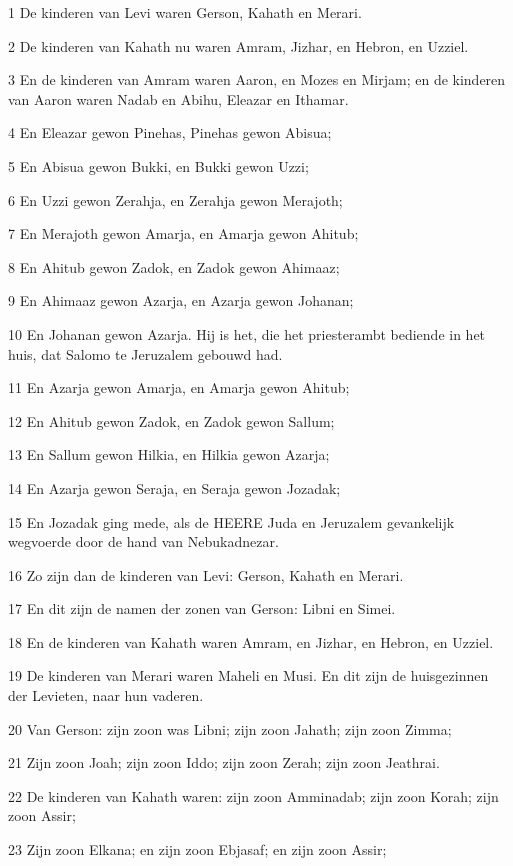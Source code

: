 \par 1 De kinderen van Levi waren Gerson, Kahath en Merari.
\par 2 De kinderen van Kahath nu waren Amram, Jizhar, en Hebron, en Uzziel.
\par 3 En de kinderen van Amram waren Aaron, en Mozes en Mirjam; en de kinderen van Aaron waren Nadab en Abihu, Eleazar en Ithamar.
\par 4 En Eleazar gewon Pinehas, Pinehas gewon Abisua;
\par 5 En Abisua gewon Bukki, en Bukki gewon Uzzi;
\par 6 En Uzzi gewon Zerahja, en Zerahja gewon Merajoth;
\par 7 En Merajoth gewon Amarja, en Amarja gewon Ahitub;
\par 8 En Ahitub gewon Zadok, en Zadok gewon Ahimaaz;
\par 9 En Ahimaaz gewon Azarja, en Azarja gewon Johanan;
\par 10 En Johanan gewon Azarja. Hij is het, die het priesterambt bediende in het huis, dat Salomo te Jeruzalem gebouwd had.
\par 11 En Azarja gewon Amarja, en Amarja gewon Ahitub;
\par 12 En Ahitub gewon Zadok, en Zadok gewon Sallum;
\par 13 En Sallum gewon Hilkia, en Hilkia gewon Azarja;
\par 14 En Azarja gewon Seraja, en Seraja gewon Jozadak;
\par 15 En Jozadak ging mede, als de HEERE Juda en Jeruzalem gevankelijk wegvoerde door de hand van Nebukadnezar.
\par 16 Zo zijn dan de kinderen van Levi: Gerson, Kahath en Merari.
\par 17 En dit zijn de namen der zonen van Gerson: Libni en Simei.
\par 18 En de kinderen van Kahath waren Amram, en Jizhar, en Hebron, en Uzziel.
\par 19 De kinderen van Merari waren Maheli en Musi. En dit zijn de huisgezinnen der Levieten, naar hun vaderen.
\par 20 Van Gerson: zijn zoon was Libni; zijn zoon Jahath; zijn zoon Zimma;
\par 21 Zijn zoon Joah; zijn zoon Iddo; zijn zoon Zerah; zijn zoon Jeathrai.
\par 22 De kinderen van Kahath waren: zijn zoon Amminadab; zijn zoon Korah; zijn zoon Assir;
\par 23 Zijn zoon Elkana; en zijn zoon Ebjasaf; en zijn zoon Assir;
